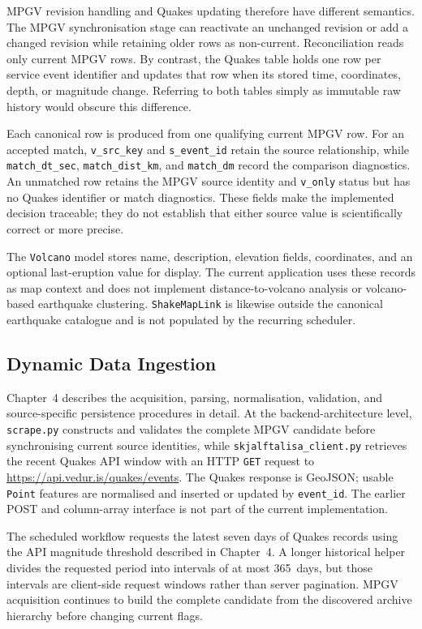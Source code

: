 \documentclass[12pt]{article}
\begin{document}
MPGV revision handling and Quakes updating therefore have different semantics. The MPGV synchronisation stage can reactivate an unchanged revision or add a changed revision while retaining older rows as non-current. Reconciliation reads only current MPGV rows. By contrast, the Quakes table holds one row per service event identifier and updates that row when its stored time, coordinates, depth, or magnitude change. Referring to both tables simply as immutable raw history would obscure this difference.

Each canonical row is produced from one qualifying current MPGV row. For an accepted match, \texttt{v\_src\_key} and \texttt{s\_event\_id} retain the source relationship, while \texttt{match\_dt\_sec}, \texttt{match\_dist\_km}, and \texttt{match\_dm} record the comparison diagnostics. An unmatched row retains the MPGV source identity and \texttt{v\_only} status but has no Quakes identifier or match diagnostics. These fields make the implemented decision traceable; they do not establish that either source value is scientifically correct or more precise.

The \texttt{Volcano} model stores name, description, elevation fields, coordinates, and an optional last-eruption value for display. The current application uses these records as map context and does not implement distance-to-volcano analysis or volcano-based earthquake clustering. \texttt{ShakeMapLink} is likewise outside the canonical earthquake catalogue and is not populated by the recurring scheduler.

\subsection{Dynamic Data Ingestion}

Chapter~4 describes the acquisition, parsing, normalisation, validation, and source-specific persistence procedures in detail. At the backend-architecture level, \texttt{scrape.py} constructs and validates the complete MPGV candidate before synchronising current source identities, while \texttt{skjalftalisa\_client.py} retrieves the recent Quakes API window with an HTTP \texttt{GET} request to \url{https://api.vedur.is/quakes/events}. The Quakes response is GeoJSON; usable \texttt{Point} features are normalised and inserted or updated by \texttt{event\_id}. The earlier POST and column-array interface is not part of the current implementation.

The scheduled workflow requests the latest seven days of Quakes records using the API magnitude threshold described in Chapter~4. A longer historical helper divides the requested period into intervals of at most 365~days, but those intervals are client-side request windows rather than server pagination. MPGV acquisition continues to build the complete candidate from the discovered archive hierarchy before changing current flags.
\end{document}
